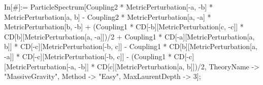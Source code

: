 In[\#]:= ParticleSpectrum[Coupling2 * MetricPerturbation[-a, -b] * MetricPerturbation[a, b] - Coupling2 * MetricPerturbation[a, -a] * MetricPerturbation[b, -b] + (Coupling1 * CD[-b][MetricPerturbation[c, -c]] * CD[b][MetricPerturbation[a, -a]])/2 + Coupling1 * CD[-a][MetricPerturbation[a, b]] * CD[-c][MetricPerturbation[-b, c]] - Coupling1 * CD[b][MetricPerturbation[a, -a]] * CD[-c][MetricPerturbation[-b, c]] - (Coupling1 * CD[-c][MetricPerturbation[-a, -b]] * CD[c][MetricPerturbation[a, b]])/2, TheoryName -> "MassiveGravity", Method -> "Easy", MaxLaurentDepth -> 3]; 